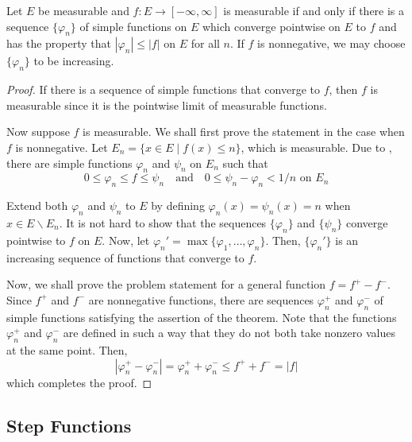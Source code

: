 \begin{theorem}
    Let $E$ be measurable and $f: E\to[-\infty,\infty]$ is measurable if and only if there is a sequence $\{\varphi_n\}$ of simple functions on $E$ which converge pointwise on $E$ to $f$ and has the property that $|\varphi_n|\le|f|$ on $E$ for all $n$. If $f$ is nonnegative, we may choose $\{\varphi_n\}$ to be increasing.
\end{theorem}
\begin{proof}
    If there is a sequence of simple functions that converge to $f$, then $f$ is measurable since it is the pointwise limit of measurable functions.

    Now suppose $f$ is measurable. We shall first prove the statement in the case when $f$ is nonnegative. Let $E_n = \{x\in E\mid f(x)\le n\}$, which is measurable. Due to , there are simple functions $\varphi_n$ and $\psi_n$ on $E_n$ such that 
    \begin{equation*}
        0\le\varphi_n\le f\le\psi_n\quad\text{and}\quad 0\le\psi_n - \varphi_n < 1/n\text{ on $E_n$}
    \end{equation*}

    Extend both $\varphi_n$ and $\psi_n$ to $E$ by defining $\varphi_n(x) = \psi_n(x) = n$ when $x\in E\backslash E_n$. It is not hard to show that the sequences $\{\varphi_n\}$ and $\{\psi_n\}$ converge pointwise to $f$ on $E$. Now, let $\varphi_n' = \max\{\varphi_1,\ldots,\varphi_n\}$. Then, $\{\varphi_n'\}$ is an increasing sequence of functions that converge to $f$.

    Now, we shall prove the problem statement for a general function $f = f^+ - f^-$. Since $f^+$ and $f^-$ are nonnegative functions, there are sequences $\varphi_n^+$ and $\varphi_n^-$ of simple functions satisfying the assertion of the theorem. Note that the functions $\varphi^+_n$ and $\varphi_n^-$ are defined in such a way that they do not both take nonzero values at the same point. Then, 
    \begin{equation*}
        |\varphi_n^+ - \varphi_n^-| = \varphi_n^+ + \varphi_n^-\le f^+ + f^- = |f|
    \end{equation*}
    which completes the proof.
\end{proof}

\subsection{Step Functions}

